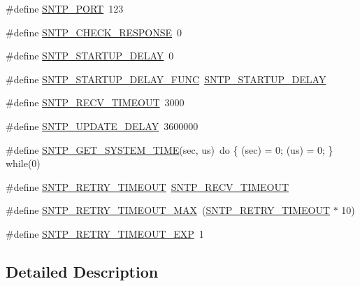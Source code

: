 \begin{DoxyCompactItemize}
\item 
\#define \hyperlink{group__sntp__opts_gacbee62c27f54371fc2c5259a834a0f9b}{S\+N\+T\+P\+\_\+\+P\+O\+RT}~123
\item 
\#define \hyperlink{group__sntp__opts_ga7d4e12d90912d486e64f289d7f3ca446}{S\+N\+T\+P\+\_\+\+C\+H\+E\+C\+K\+\_\+\+R\+E\+S\+P\+O\+N\+SE}~0
\item 
\#define \hyperlink{group__sntp__opts_ga22017d43da7d4bf8d42e786b4ced4dfa}{S\+N\+T\+P\+\_\+\+S\+T\+A\+R\+T\+U\+P\+\_\+\+D\+E\+L\+AY}~0
\item 
\#define \hyperlink{group__sntp__opts_gae082c2f3044d500ca5e1be1d4928de75}{S\+N\+T\+P\+\_\+\+S\+T\+A\+R\+T\+U\+P\+\_\+\+D\+E\+L\+A\+Y\+\_\+\+F\+U\+NC}~\hyperlink{group__sntp__opts_ga22017d43da7d4bf8d42e786b4ced4dfa}{S\+N\+T\+P\+\_\+\+S\+T\+A\+R\+T\+U\+P\+\_\+\+D\+E\+L\+AY}
\item 
\#define \hyperlink{group__sntp__opts_ga44cf26b9b19832d88599244711a12d08}{S\+N\+T\+P\+\_\+\+R\+E\+C\+V\+\_\+\+T\+I\+M\+E\+O\+UT}~3000
\item 
\#define \hyperlink{group__sntp__opts_ga9232c56443115be05a2f852eba21979c}{S\+N\+T\+P\+\_\+\+U\+P\+D\+A\+T\+E\+\_\+\+D\+E\+L\+AY}~3600000
\item 
\#define \hyperlink{group__sntp__opts_gab0ea385479a5c5c8c173f165ded2fb63}{S\+N\+T\+P\+\_\+\+G\+E\+T\+\_\+\+S\+Y\+S\+T\+E\+M\+\_\+\+T\+I\+ME}(sec,  us)~do \{ (sec) = 0; (us) = 0; \} while(0)
\item 
\#define \hyperlink{group__sntp__opts_ga86d651d8eb07687208308deef95a23ba}{S\+N\+T\+P\+\_\+\+R\+E\+T\+R\+Y\+\_\+\+T\+I\+M\+E\+O\+UT}~\hyperlink{group__sntp__opts_ga44cf26b9b19832d88599244711a12d08}{S\+N\+T\+P\+\_\+\+R\+E\+C\+V\+\_\+\+T\+I\+M\+E\+O\+UT}
\item 
\#define \hyperlink{group__sntp__opts_gafde10b3ed7cb4bb2cd2c4daa389db699}{S\+N\+T\+P\+\_\+\+R\+E\+T\+R\+Y\+\_\+\+T\+I\+M\+E\+O\+U\+T\+\_\+\+M\+AX}~(\hyperlink{group__sntp__opts_ga86d651d8eb07687208308deef95a23ba}{S\+N\+T\+P\+\_\+\+R\+E\+T\+R\+Y\+\_\+\+T\+I\+M\+E\+O\+UT} $\ast$ 10)
\item 
\#define \hyperlink{group__sntp__opts_gafdb7e98f608cc429188d7dac356614c2}{S\+N\+T\+P\+\_\+\+R\+E\+T\+R\+Y\+\_\+\+T\+I\+M\+E\+O\+U\+T\+\_\+\+E\+XP}~1
\end{DoxyCompactItemize}


\subsection{Detailed Description}


